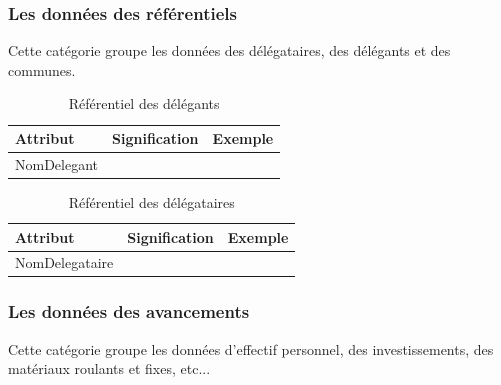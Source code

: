 \documentclass[a4paper]{report}
\begin{document}
\begin{doublespace}
	\subsubsection{Les données des référentiels}
    
    Cette catégorie groupe les données des délégataires, des délégants et des communes.

	\begin{table}[H]
		\begin{center}
			\begin{tabularx}{17.5cm}{|X|p{3cm}|p{1.5cm}|}
				\hline
				\textbf{Attribut} & \textbf{Signification} & \textbf{Exemple} \\
				\hline
				NomDelegant       &                        &                  \\
				\hline
			\end{tabularx}
			\caption{Référentiel des délégants}
		\end{center}
	\end{table}

	\begin{table}[H]
		\begin{center}
			\begin{tabularx}{17.5cm}{|X|p{3cm}|p{1.5cm}|}
				\hline
				\textbf{Attribut} & \textbf{Signification} & \textbf{Exemple} \\
				\hline
				NomDelegataire    &                        &                  \\
				\hline
			\end{tabularx}
			\caption{Référentiel des délégataires}
		\end{center}
	\end{table}

	\subsubsection{Les données des avancements}
    
    Cette catégorie groupe les données d'effectif personnel, des investissements, des matériaux roulants et fixes, etc...



\end{doublespace}
\end{document}
